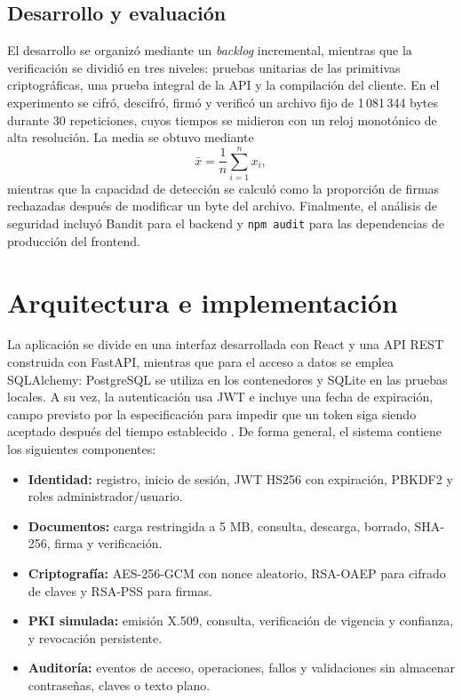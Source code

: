 \documentclass[conference]{IEEEtran}
\begin{document}
\subsection{Desarrollo y evaluación}
El desarrollo se organizó mediante un \textit{backlog} incremental, mientras que la verificación se dividió en tres niveles: pruebas unitarias de las primitivas criptográficas, una prueba integral de la API y la compilación del cliente. En el experimento se cifró, descifró, firmó y verificó un archivo fijo de 1\,081\,344 bytes durante 30 repeticiones, cuyos tiempos se midieron con un reloj monotónico de alta resolución. La media se obtuvo mediante
\begin{equation}
\bar{x}=\frac{1}{n}\sum_{i=1}^{n}x_i,
\end{equation}
mientras que la capacidad de detección se calculó como la proporción de firmas rechazadas después de modificar un byte del archivo. Finalmente, el análisis de seguridad incluyó Bandit para el backend y \texttt{npm audit} para las dependencias de producción del frontend.

\section{Arquitectura e implementación}
La aplicación se divide en una interfaz desarrollada con React y una API REST construida con FastAPI, mientras que para el acceso a datos se emplea SQLAlchemy: PostgreSQL se utiliza en los contenedores y SQLite en las pruebas locales. A su vez, la autenticación usa JWT e incluye una fecha de expiración, campo previsto por la especificación para impedir que un token siga siendo aceptado después del tiempo establecido \cite{rfc7519}. De forma general, el sistema contiene los siguientes componentes:
\begin{itemize}
 \item \textbf{Identidad:} registro, inicio de sesión, JWT HS256 con expiración, PBKDF2 y roles administrador/usuario.
 \item \textbf{Documentos:} carga restringida a 5 MB, consulta, descarga, borrado, SHA-256, firma y verificación.
 \item \textbf{Criptografía:} AES-256-GCM con nonce aleatorio, RSA-OAEP para cifrado de claves y RSA-PSS para firmas.
 \item \textbf{PKI simulada:} emisión X.509, consulta, verificación de vigencia y confianza, y revocación persistente.
 \item \textbf{Auditoría:} eventos de acceso, operaciones, fallos y validaciones sin almacenar contraseñas, claves o texto plano.
\end{itemize}
\end{document}
